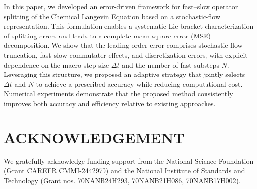 \documentclass{article}
\begin{document}
In this paper, we developed an error-driven framework for fast--slow operator
splitting of the Chemical Langevin Equation based on a stochastic-flow
representation. This formulation enables a systematic Lie‑bracket characterization of splitting errors and leads to a complete mean‑square error (MSE) decomposition. We show that the leading‑order error comprises stochastic‑flow truncation, fast–slow commutator effects, and discretization errors, with explicit dependence on the macro‑step size
$\Delta t$ and the number of fast substeps $N$. Leveraging this structure, we proposed an adaptive strategy that jointly selects
$\Delta t$ and $N$ to achieve a prescribed accuracy while reducing computational cost. Numerical experiments demonstrate that the proposed method consistently improves both accuracy and efficiency relative to existing approaches.

\section*{ACKNOWLEDGEMENT}
We gratefully acknowledge funding support from the National Science Foundation (Grant CAREER CMMI-2442970) and the National Institute of Standards and Technology (Grant nos. 70NANB24H293, 70NANB21H086, 70NANB17H002).




%

\footnotesize




\end{document}
